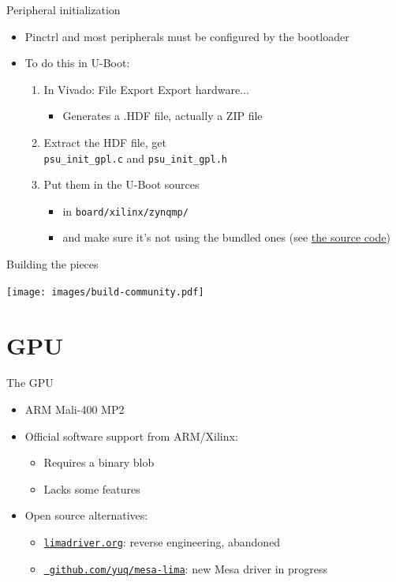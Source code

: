 \documentclass[xetex,table]{beamer}
\begin{document}
\begin{frame}{Peripheral initialization}
  \begin{itemize}
  \item Pinctrl and most peripherals must be configured by the
    bootloader
  \item To do this in U-Boot:
    \begin{enumerate}
    \item In Vivado: File \textrightarrow{} Export \textrightarrow{}
      Export hardware...
      \begin{itemize}
      \item Generates a .HDF file, actually a ZIP file
      \end{itemize}
    \item Extract the HDF file, get\\
      {\tt psu\_init\_gpl.c} and {\tt psu\_init\_gpl.h}
    \item Put them in the U-Boot sources
      \begin{itemize}
      \item in {\tt board/xilinx/zynqmp/}
      \item and make sure it's not using the bundled ones (see
        \href{https://github.com/xilinx/u-boot-xlnx/tree/a703fb6e3c6c5a7f57321e258a58d241e2afdc45/board/xilinx/zynqmp}{the
          source code})
      \end{itemize}
    \end{enumerate}
  \end{itemize}
\end{frame}

\begin{frame}{Building the pieces}
  \begin{center}
    \texttt{[image: images/build-community.pdf]}
  \end{center}
\end{frame}

\section{GPU}

\begin{frame}{The GPU}
  \begin{itemize}
  \item ARM Mali-400 MP2
  \item Official software support from ARM/Xilinx:
    \begin{itemize}
    \item Requires a binary blob
    \item Lacks some features
    \end{itemize}
  \item Open source alternatives:
    \begin{itemize}
    \item \href{https://limadriver.org/}{\tt limadriver.org}: reverse
      engineering, abandoned
    \item \href{https://github.com/yuq/mesa-lima}{\tt
      github.com/yuq/mesa-lima}: new Mesa driver in progress
    \end{itemize}
  \end{itemize}
\end{frame}
\end{document}

